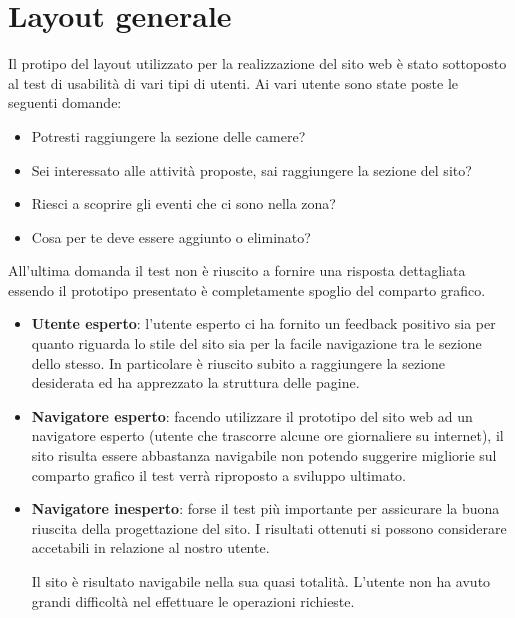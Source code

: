 \documentclass[a4paper,12pt,hidelinks]{report}
\begin{document}
\section*{Layout generale}
Il protipo del layout utilizzato per la realizzazione del sito web è stato sottoposto al test di usabilità di vari tipi di utenti.
Ai vari utente sono state poste le seguenti domande:
\begin{itemize}
 \item Potresti raggiungere la sezione delle camere?
 \item Sei interessato alle attività proposte, sai raggiungere la sezione del sito?
 \item Riesci a scoprire gli eventi che ci sono nella zona?
 \item Cosa per te deve essere aggiunto o eliminato?
\end{itemize}
All'ultima domanda il test non è riuscito a fornire una risposta dettagliata essendo il prototipo presentato è completamente spoglio del comparto grafico.

\begin{itemize}
 \item \textbf{Utente esperto}: l'utente esperto ci ha fornito un feedback positivo sia per quanto riguarda lo stile del sito sia per la facile navigazione tra le sezione
 dello stesso. In particolare è riuscito subito a raggiungere la sezione desiderata ed ha apprezzato la struttura delle pagine.
 \item \textbf{Navigatore esperto}: facendo utilizzare il prototipo del sito web ad un navigatore esperto (utente che trascorre alcune ore giornaliere su internet), il sito 
 risulta essere abbastanza navigabile non potendo suggerire migliorie sul comparto grafico il test verrà riproposto a sviluppo ultimato.
 \item \textbf{Navigatore inesperto}: forse il test più importante per assicurare la buona riuscita della progettazione del sito. I risultati ottenuti si possono considerare 
 accetabili in relazione al nostro utente. 
 \par Il sito è risultato navigabile nella sua quasi totalità. L'utente non ha avuto grandi difficoltà nel effettuare le operazioni richieste.
\end{itemize}
\end{document}
